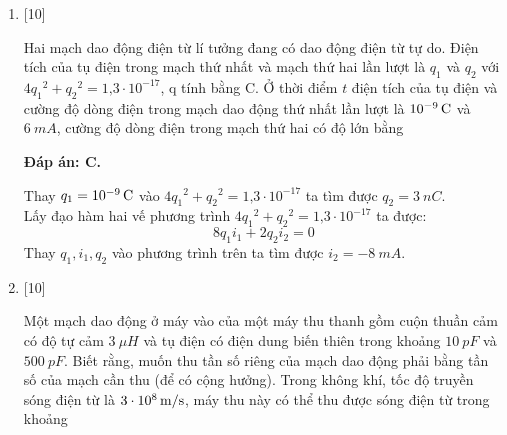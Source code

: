 \begin{enumerate}[label=\bfseries Câu \arabic*:]
	\item {} [10]
	
	\cauhoi
	{Hai mạch dao động điện từ lí tưởng đang có dao động điện từ tự do. Điện tích của tụ điện trong mạch thứ nhất và mạch thứ hai lần lượt là $q_1$ và $q_2$ với $4{q_1}^{2}+{q_2}^{2} = \text{1,3}\cdot10^{-17}$, q tính bằng C. Ở thời điểm $t$ điện tích của tụ điện và cường độ dòng điện trong mạch dao động thứ nhất lần lượt là $\xsi{10^{-9}}{C}$ và $\SI{6}{mA}$, cường độ dòng điện trong mạch thứ hai có độ lớn bằng
	}
	
	\loigiai
	{		\textbf{Đáp án: C.}
		
		Thay $q_1 = \xsi{10^{-9}}{C}$ vào $4{q_1}^{2}+{q_2}^{2} = \text{1,3}\cdot10^{-17}$ ta tìm được $q_2 = \SI{3}{nC}$. \\
Lấy đạo hàm hai vế phương trình $4{q_1}^{2}+{q_2}^{2} = \text{1,3}\cdot10^{-17}$ ta được:
    $$
    8{q_1}{i_1} + 2{q_2}{i_2} = 0
    $$
Thay $q_1, i_1, q_2$ vào phương trình trên ta tìm được $i_2 = \SI{-8}{mA}.$
		
	}
	
	
	
	
	\item {} [10]
	
	\cauhoi
	{Một mạch dao động ở máy vào của một máy thu thanh gồm cuộn thuần cảm có độ tự cảm $\SI{3}{\mu H}$ và tụ điện có điện dung biến thiên trong khoảng $\SI{10}{pF}$ và $\SI{500}{pF}$. Biết rằng, muốn thu tần số riêng của mạch dao động phải bằng tần số của mạch cần thu (để có cộng hưởng). Trong không khí, tốc độ truyền sóng điện từ là $\xsi{3\cdot10^{8}}{m/s}$, máy thu này có thể thu được sóng điện từ trong khoảng
	}
	

\end{enumerate}
